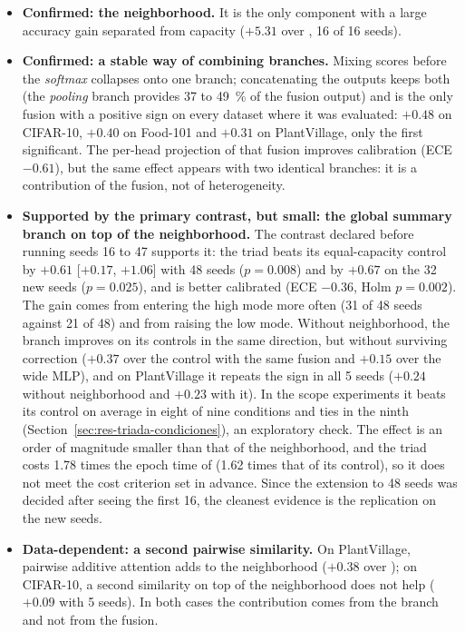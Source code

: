 \begin{itemize}
  \item \textbf{Confirmed: the neighborhood.} It is the only component with a large accuracy gain separated from capacity ($+5.31$ over , 16 of 16 seeds).
  \item \textbf{Confirmed: a stable way of combining branches.} Mixing scores before the \emph{softmax} collapses onto one branch; concatenating the outputs keeps both (the \emph{pooling} branch provides 37 to 49~\% of the fusion output) and is the only fusion with a positive sign on every dataset where it was evaluated: $+0.48$ on CIFAR-10, $+0.40$ on Food-101 and $+0.31$ on PlantVillage, only the first significant. The per-head projection of that fusion improves calibration (ECE $-0.61$), but the same effect appears with two identical  branches: it is a contribution of the fusion, not of heterogeneity.
  \item \textbf{Supported by the primary contrast, but small: the global summary branch on top of the neighborhood.} The contrast declared before running seeds 16 to 47 supports it: the triad beats its equal-capacity control by $+0.61$ [$+0.17$, $+1.06$] with 48 seeds ($p=0.008$) and by $+0.67$ on the 32 new seeds ($p=0.025$), and is better calibrated (ECE $-0.36$, Holm $p=0.002$). The gain comes from entering the high mode more often (31 of 48 seeds against 21 of 48) and from raising the low mode. Without neighborhood, the branch improves on its controls in the same direction, but without surviving correction ($+0.37$ over the control with the same fusion and $+0.15$ over the wide MLP), and on PlantVillage it repeats the sign in all 5 seeds ($+0.24$ without neighborhood and $+0.23$ with it). In the scope experiments it beats its control on average in eight of nine conditions and ties in the ninth (Section~\ref{sec:res-triada-condiciones}), an exploratory check. The effect is an order of magnitude smaller than that of the neighborhood, and the triad costs 1.78 times the epoch time of  (1.62 times that of its control), so it does not meet the cost criterion set in advance. Since the extension to 48 seeds was decided after seeing the first 16, the cleanest evidence is the replication on the new seeds.
  \item \textbf{Data-dependent: a second pairwise similarity.} On PlantVillage, pairwise additive attention adds to the neighborhood ($+0.38$ over ); on CIFAR-10, a second similarity on top of the neighborhood does not help ($+0.09$ with 5 seeds). In both cases the contribution comes from the branch and not from the fusion.
\end{itemize}

